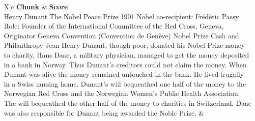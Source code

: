 \begin{table}[h!]
    \footnotesize
    \caption{Evaluation of text segmentation using a Small to Big technique (base chunk size 1024), text chunks derived from the entry "Henry Dunant award Nobel Peace Prize".}
    \begin{xltabular}{\linewidth}{X|c}
        \toprule
        \textbf{Chunk}                                                                                                                                                                                                                                                                                                                                                                                                                                                                                                                                                                                                                                                                                                                                                                                                                                                                                                                                                                                                                                                                                                                       & \textbf{Score} \\
        \midrule
        Henry Dunant The Nobel Peace Prize 1901 Nobel co-recipient: Frédéric Passy Role: Founder of the International Committee of the Red Cross, Geneva, Originator Geneva Convention (Convention de Genève) Nobel Prize Cash and Philanthropy Jean Henry Dunant, though poor, donated his Nobel Prize money to charity. Hans Daae, a military physician, managed to get the money deposited in a bank in Norway. Thus Dunant’s creditors could not claim the money. When Dunant was alive the money remained untouched in the bank. He lived frugally in a Swiss nursing home.  Dunant’s will bequeathed one half of the money to the Norwegian Red Cross and the Norwegian Women’s Public Health Association. The will bequeathed the other half of the money to charities in Switzerland.  Daae was also responsible for Dunant being awarded the Noble Prize. & \\
        \bottomrule
    \end{xltabular}
    \label{tab:table-small2big}
\end{table}

